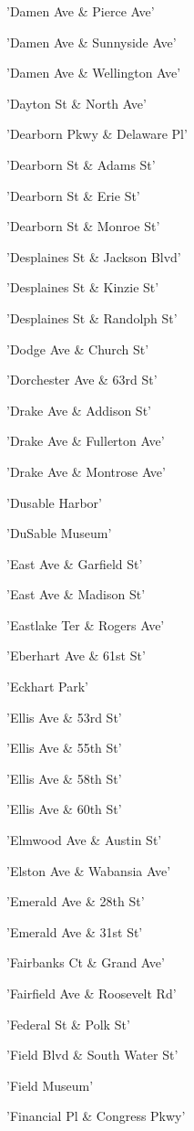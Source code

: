 \documentclass[11pt]{article}
\begin{document}
\begin{enumerate*}
\item 'Damen Ave \& Pierce Ave'
\item 'Damen Ave \& Sunnyside Ave'
\item 'Damen Ave \& Wellington Ave'
\item 'Dayton St \& North Ave'
\item 'Dearborn Pkwy \& Delaware Pl'
\item 'Dearborn St \& Adams St'
\item 'Dearborn St \& Erie St'
\item 'Dearborn St \& Monroe St'
\item 'Desplaines St \& Jackson Blvd'
\item 'Desplaines St \& Kinzie St'
\item 'Desplaines St \& Randolph St'
\item 'Dodge Ave \& Church St'
\item 'Dorchester Ave \& 63rd St'
\item 'Drake Ave \& Addison St'
\item 'Drake Ave \& Fullerton Ave'
\item 'Drake Ave \& Montrose Ave'
\item 'Dusable Harbor'
\item 'DuSable Museum'
\item 'East Ave \& Garfield St'
\item 'East Ave \& Madison St'
\item 'Eastlake Ter \& Rogers Ave'
\item 'Eberhart Ave \& 61st St'
\item 'Eckhart Park'
\item 'Ellis Ave \& 53rd St'
\item 'Ellis Ave \& 55th St'
\item 'Ellis Ave \& 58th St'
\item 'Ellis Ave \& 60th St'
\item 'Elmwood Ave \& Austin St'
\item 'Elston Ave \& Wabansia Ave'
\item 'Emerald Ave \& 28th St'
\item 'Emerald Ave \& 31st St'
\item 'Fairbanks Ct \& Grand Ave'
\item 'Fairfield Ave \& Roosevelt Rd'
\item 'Federal St \& Polk St'
\item 'Field Blvd \& South Water St'
\item 'Field Museum'
\item 'Financial Pl \& Congress Pkwy'

\end{enumerate*}
\end{document}
